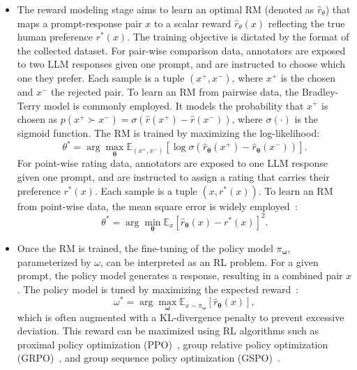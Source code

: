 \documentclass[]{arxiv_singlecolumn}
\theoremstyle{plain}
\theoremstyle{definition}
\theoremstyle{remark}
\begin{document}
\begin{itemize}[leftmargin=*]
    \item The reward modeling stage aims to learn an optimal RM (denoted as $\hat{r}_{\theta}$) that maps a prompt-response pair $x$ to a scalar reward $\hat{r}_{\theta}(x)$ reflecting the true human preference $r^*(x)$. The training objective is dictated by the format of the collected dataset. 
    For pair-wise comparison data, annotators are exposed to two LLM responses given one prompt, and are instructed to choose which one they prefer. Each sample is a tuple $(x^+, x^-)$, where $x^+$ is the chosen and $x^-$ the rejected pair. To learn an RM from pairwise data, the Bradley-Terry model \citep{bradleyterry} is commonly employed. It models the probability that  $x^+$ is chosen as $p\left(x^+ \succ x^-\right)=\sigma\left(\hat{r}\left(x^+\right)-\hat{r}\left(x^-\right)\right)$, where $\sigma(\cdot )$ is the sigmoid function. The RM is trained by maximizing the log-likelihood:
    \begin{equation}
        \theta^*=\arg\max_{\mathbf{\theta}}\mathbb{E}_{\left(x^+, x^-\right)}\left[\log \sigma\left(\hat{r}_{\mathbf{\theta}}\left(x^+\right)-\hat{r}_{\mathbf{\theta}}\left(x^-\right)\right)\right].
    \label{eqn:standardrm_loss}
    \end{equation}
    For point-wise rating data, annotators are exposed to one LLM response given one prompt, and are instructed to assign a rating that carries their preference $r^*(x)$. Each sample is a tuple $\left(x, r^*(x)\right)$. To learn an RM from  point-wise data, the mean square error is widely employed~\citep{armo}:
    \begin{equation}
    \theta^*=\arg\min_{\mathbf{\theta}}\mathbb{E}_{x}\left[\hat{r}_{\mathbf{\theta}}\left(x\right)-r^*\left(x\right) \right]^2.
        \label{eqn:standardrm_loss2}
    \end{equation}
    \item Once the RM is trained, the fine-tuning of the policy model $\pi_{\mathbf{\omega}}$, parameterized by $\omega$, can be interpreted as an RL problem. For a given prompt, the policy model generates a response, resulting in a combined pair $x$. The policy model is tuned by maximizing the expected reward~\citep{fanlearnable}:
    \begin{equation}
    \omega^*=\arg\max_{\mathbf{\omega}} \mathbb{E}_{x \sim \pi_{\mathbf{\omega}}} \left[ \hat{r}_{\mathbf{\theta}}(x) \right],
    \label{eqn:standardrl_loss}
    \end{equation}
    which is often augmented with a KL-divergence penalty to prevent excessive deviation. This reward can be maximized using RL algorithms such as proximal policy optimization (PPO)~\citep{ppo}, group relative policy optimization (GRPO)~\citep{guo2025deepseek}, and group sequence policy optimization (GSPO)~\citep{gspo}.
\end{itemize}
\end{document}
